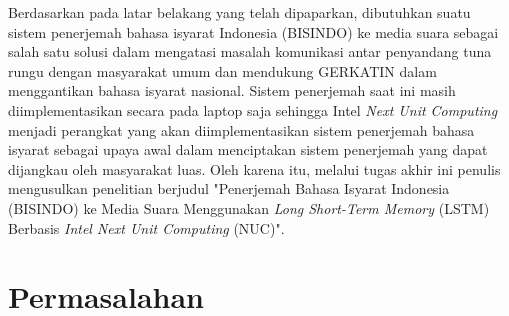 
Berdasarkan pada latar belakang yang telah dipaparkan, dibutuhkan suatu sistem penerjemah bahasa isyarat Indonesia (BISINDO) ke media suara sebagai salah satu solusi dalam mengatasi masalah komunikasi antar penyandang tuna rungu dengan masyarakat umum dan mendukung GERKATIN dalam menggantikan bahasa isyarat nasional. Sistem penerjemah saat ini masih diimplementasikan secara pada laptop saja sehingga Intel \emph{Next Unit Computing} menjadi perangkat yang akan diimplementasikan sistem penerjemah bahasa isyarat sebagai upaya awal dalam menciptakan sistem penerjemah yang dapat dijangkau oleh masyarakat luas. Oleh karena itu, melalui tugas akhir ini penulis mengusulkan penelitian berjudul "Penerjemah Bahasa Isyarat Indonesia (BISINDO) ke Media Suara Menggunakan \emph{Long Short-Term Memory} (LSTM) Berbasis \emph{Intel Next Unit Computing} (NUC)".    

\section{Permasalahan}
\label{sec:permasalahan}


